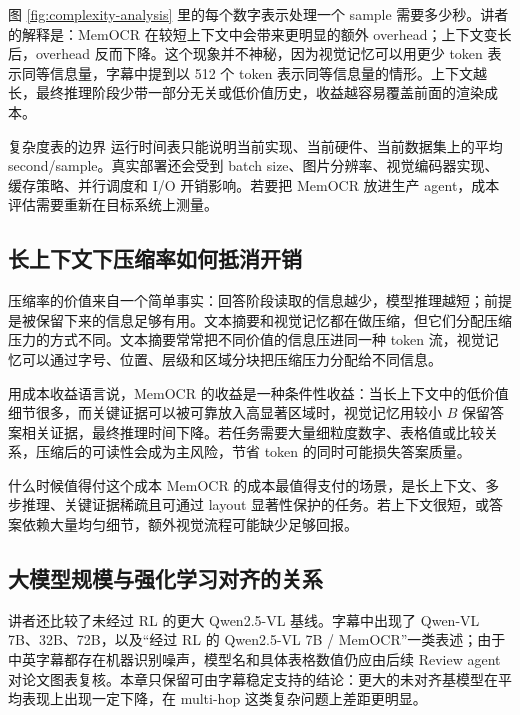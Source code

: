 图 \ref{fig:complexity-analysis} 里的每个数字表示处理一个 sample 需要多少秒。讲者的解释是：MemOCR 在较短上下文中会带来更明显的额外 overhead；上下文变长后，overhead 反而下降。这个现象并不神秘，因为视觉记忆可以用更少 token 表示同等信息量，字幕中提到以 512 个 token 表示同等信息量的情形。上下文越长，最终推理阶段少带一部分无关或低价值历史，收益越容易覆盖前面的渲染成本。

\begin{warningbox}{复杂度表的边界}
运行时间表只能说明当前实现、当前硬件、当前数据集上的平均 second/sample。真实部署还会受到 batch size、图片分辨率、视觉编码器实现、缓存策略、并行调度和 I/O 开销影响。若要把 MemOCR 放进生产 agent，成本评估需要重新在目标系统上测量。
\end{warningbox}

\subsection{长上下文下压缩率如何抵消开销}

压缩率的价值来自一个简单事实：回答阶段读取的信息越少，模型推理越短；前提是被保留下来的信息足够有用。文本摘要和视觉记忆都在做压缩，但它们分配压缩压力的方式不同。文本摘要常常把不同价值的信息压进同一种 token 流，视觉记忆可以通过字号、位置、层级和区域分块把压缩压力分配给不同信息。

用成本收益语言说，MemOCR 的收益是一种条件性收益：当长上下文中的低价值细节很多，而关键证据可以被可靠放入高显著区域时，视觉记忆用较小 $B$ 保留答案相关证据，最终推理时间下降。若任务需要大量细粒度数字、表格值或比较关系，压缩后的可读性会成为主风险，节省 token 的同时可能损失答案质量。

\begin{importantbox}{什么时候值得付这个成本}
MemOCR 的成本最值得支付的场景，是长上下文、多步推理、关键证据稀疏且可通过 layout 显著性保护的任务。若上下文很短，或答案依赖大量均匀细节，额外视觉流程可能缺少足够回报。
\end{importantbox}

\subsection{大模型规模与强化学习对齐的关系}

讲者还比较了未经过 RL 的更大 Qwen2.5-VL 基线。字幕中出现了 Qwen-VL 7B、32B、72B，以及“经过 RL 的 Qwen2.5-VL 7B / MemOCR”一类表述；由于中英字幕都存在机器识别噪声，模型名和具体表格数值仍应由后续 Review agent 对论文图表复核。本章只保留可由字幕稳定支持的结论：更大的未对齐基模型在平均表现上出现一定下降，在 multi-hop 这类复杂问题上差距更明显。

